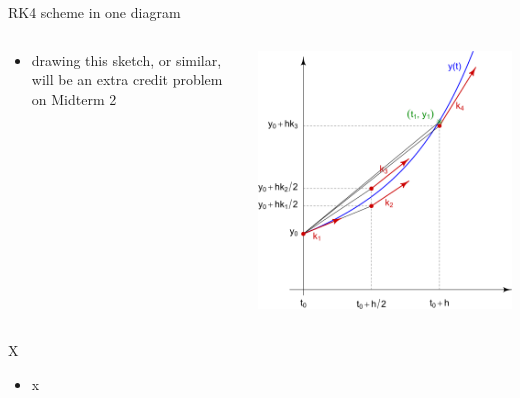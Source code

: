 \documentclass[urlcolor=blue,dvipsnames]{beamer}
\begin{document}
\begin{frame}{RK4 scheme in one diagram}

\begin{columns}
\begin{column}{0.35\textwidth}
\small
\begin{itemize}
\item drawing this sketch, or similar, will be an extra credit problem on Midterm 2
\end{itemize}
\end{column}
\begin{column}{0.65\textwidth}
\hfill \includegraphics[width=\textwidth]{figs/rk4diagram}
\end{column}
\end{columns}
\end{frame}



\begin{frame}{X}

\begin{itemize}
\item x
\end{itemize}
\end{frame}
\end{document}
